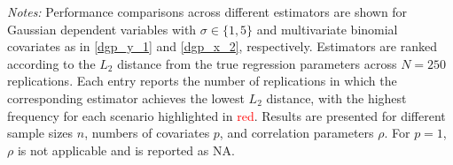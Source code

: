 \begin{table}
\begin{tablenotes}[flushleft]
\footnotesize
\item \emph{Notes:} Performance comparisons across different estimators are shown for Gaussian dependent variables with $\sigma\in\{1,5\}$ and multivariate binomial covariates as in \eqref{dgp_y_1} and \eqref{dgp_x_2}, respectively. Estimators are ranked according to the $L_2$ distance from the true regression parameters across $N=250$ replications. Each entry reports the number of replications in which the corresponding estimator achieves the lowest $L_2$ distance, with the highest frequency for each scenario highlighted in \textcolor{red}{red}. Results are presented for different sample sizes $n$, numbers of covariates $p$, and correlation parameters $\rho$. For $p=1$, $\rho$ is not applicable and is reported as NA.
\end{tablenotes}
\end{table}
